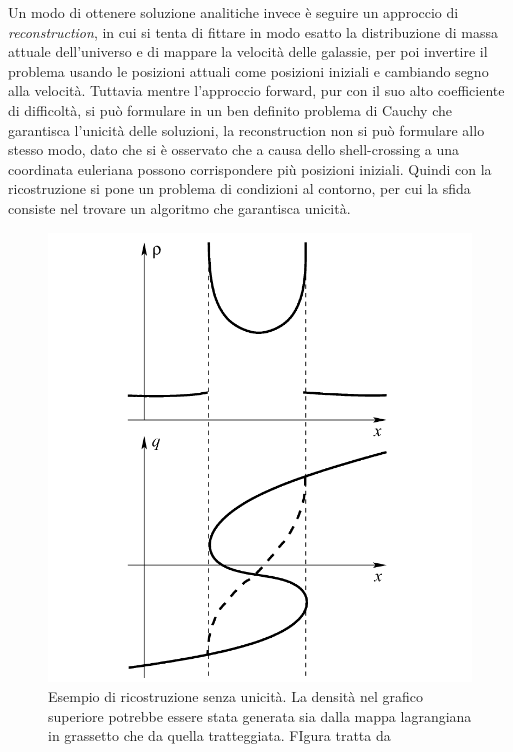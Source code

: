 Un modo di ottenere soluzione analitiche invece è seguire un approccio di \textit{reconstruction}, in cui
si tenta di fittare in modo esatto la distribuzione di massa attuale dell'universo e di mappare la velocità 
delle galassie, per poi invertire il problema usando le posizioni attuali come posizioni iniziali e 
cambiando segno alla velocità. 
Tuttavia mentre l'approccio forward, pur con il suo alto coefficiente di difficoltà, si può formulare
in un ben definito problema di Cauchy che garantisca l'unicità delle soluzioni, la reconstruction non
si può formulare allo stesso modo, dato che si è osservato che a causa dello shell-crossing a una 
coordinata euleriana possono corrispondere più posizioni iniziali. Quindi con la ricostruzione si pone 
un problema di condizioni al contorno, per cui la sfida consiste nel trovare un algoritmo che garantisca
unicità.

\begin{center}
	\begin{figure}[H]
		\centering
		\includegraphics[scale=0.5, angle=0]{rec.png}
        \caption{Esempio di ricostruzione senza unicità. La densità nel grafico superiore potrebbe essere stata generata
        sia dalla mappa lagrangiana in grassetto che da quella tratteggiata. FIgura tratta da \cite{matarrese}}
		\label{fig:rec}
	\end{figure}
\end{center}


